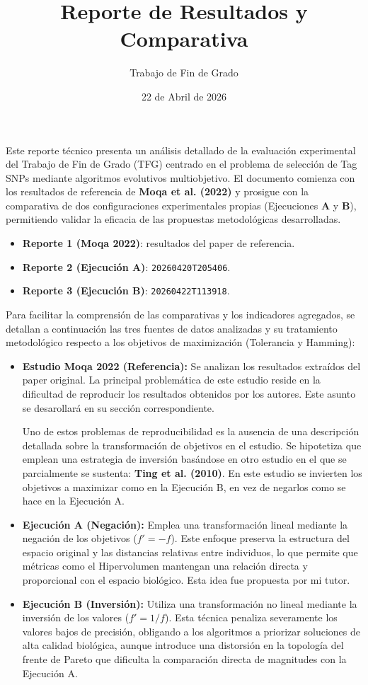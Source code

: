 \documentclass[a4paper,10pt]{article} %
\title{Reporte de Resultados y Comparativa}
\author{Trabajo de Fin de Grado}
\date{22 de Abril de 2026}
\begin{document}
\maketitle

Este reporte técnico presenta un análisis detallado de la evaluación experimental del Trabajo de Fin de Grado (TFG) centrado en el problema de selección de Tag SNPs mediante algoritmos evolutivos multiobjetivo. El documento comienza con los resultados de referencia de \textbf{Moqa et al. (2022)} y prosigue con la comparativa de dos configuraciones experimentales propias (Ejecuciones \textbf{A} y \textbf{B}), permitiendo validar la eficacia de las propuestas metodológicas desarrolladas.

\begin{itemize}
    \item \textbf{Reporte 1 (Moqa 2022)}: resultados del paper de referencia.
    \item \textbf{Reporte 2 (Ejecución A)}: \texttt{20260420T205406}.
    \item \textbf{Reporte 3 (Ejecución B)}: \texttt{20260422T113918}.
\end{itemize}

Para facilitar la comprensión de las comparativas y los indicadores agregados, se detallan a continuación las tres fuentes de datos analizadas y su tratamiento metodológico respecto a los objetivos de maximización (Tolerancia y Hamming):

\begin{itemize}
    \item \textbf{Estudio Moqa 2022 (Referencia):} Se analizan los resultados extraídos del paper original. La principal problemática de este estudio reside en la dificultad de reproducir los resultados obtenidos por los autores. Este asunto se desarollará en su sección correspondiente. 
    
    Uno de estos problemas de reproducibilidad es la ausencia de una descripción detallada sobre la transformación de objetivos en el estudio. Se hipotetiza que emplean una estrategia de inversión basándose en otro estudio en el que se parcialmente se sustenta: \textbf{Ting et al. (2010)}. En este estudio se invierten los objetivos a maximizar como en la Ejecución B, en vez de negarlos como se hace en la Ejecución A.
    \item \textbf{Ejecución A (Negación):} Emplea una transformación lineal mediante la negación de los objetivos ($f' = -f$). Este enfoque preserva la estructura del espacio original y las distancias relativas entre individuos, lo que permite que métricas como el Hipervolumen mantengan una relación directa y proporcional con el espacio biológico. Esta idea fue propuesta por mi tutor.
    \item \textbf{Ejecución B (Inversión):} Utiliza una transformación no lineal mediante la inversión de los valores ($f' = 1/f$). Esta técnica penaliza severamente los valores bajos de precisión, obligando a los algoritmos a priorizar soluciones de alta calidad biológica, aunque introduce una distorsión en la topología del frente de Pareto que dificulta la comparación directa de magnitudes con la Ejecución A.
\end{itemize}
\end{document}
